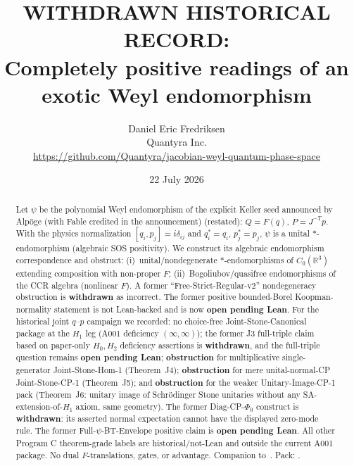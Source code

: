 \documentclass[11pt]{article}
\title{WITHDRAWN HISTORICAL RECORD:\\
Completely positive readings of an exotic Weyl endomorphism}
\author{Daniel Eric Fredriksen\\
Quantyra Inc.\\
\url{https://github.com/Quantyra/jacobian-weyl-quantum-phase-space}}
\date{22 July 2026}
\newcommand{\filepath}[1]{\path{#1}}
\begin{document}
\maketitle

\begin{center}
\end{center}

\begin{abstract}
Let \(\psi\) be the polynomial Weyl endomorphism of the explicit Keller seed
announced by Alp\"oge (with Fable credited in the announcement)
(restated): \(Q=F(q)\), \(P=J^{-T}p\). With the physics normalization
\([q_i,p_j]=i\delta_{ij}\) and \(q_i^*=q_i\), \(p_j^*=p_j\), \(\psi\) is a unital
\(*\)-endomorphism (algebraic SOS positivity). We construct its algebraic
endomorphism correspondence and obstruct: (i)~unital/\allowbreak nondegenerate
\(*\)-endomorphisms of \(C_0(\mathbb{R}^3)\) extending composition with non-proper
\(F\); (ii)~Bogoliubov/quasifree endomorphisms of the CCR algebra (nonlinear
\(F\)). A former ``Free-Strict-Regular-v2'' nondegeneracy obstruction is
\textbf{withdrawn} as incorrect. The former positive bounded-Borel
Koopman-normality statement is not Lean-backed and is now
\textbf{open pending Lean}. For the historical joint \(q\)--\(p\) campaign
we recorded: no choice-free
Joint-Stone-Canonical package at the \(H_1\) leg (A001 deficiency
\((\infty,\infty)\)); the former J3 full-triple claim based on paper-only
\(H_0,H_2\) deficiency assertions is \textbf{withdrawn}, and the
full-triple question remains \textbf{open pending Lean};
\textbf{obstruction} for multiplicative single-generator Joint-Stone-Hom-1
(Theorem~J4); \textbf{obstruction} for mere unital-normal-CP
Joint-Stone-CP-1 (Theorem~J5); and \textbf{obstruction} for the weaker
Unitary-Image-CP-1 pack (Theorem~J6: unitary image of Schr\"odinger Stone
unitaries without any SA-extension-of-\(H_1\) axiom, same geometry).
The former Diag-CP-\(\Phi_0\) construct is \textbf{withdrawn}: its asserted
normal expectation cannot have the displayed zero-mode rule. The former
Full-$\psi$-BT-Envelope positive claim is \textbf{open pending Lean}.
All other Program C theorem-grade labels are historical/not-Lean and outside
the current A001 package.
No dual \(F\)-translations, gates, or advantage. Companion
to~\cite{A001}. Pack: \filepath{COMPANION-PACK.md}.
\end{abstract}
\end{document}
